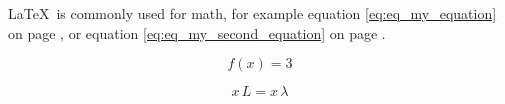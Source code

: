 \documentclass{article}
\begin{document}
\LaTeX~is commonly used for math, for example
equation \ref{eq:eq_my_equation} on page \pageref{eq:eq_my_equation}, or
equation \ref{eq:eq_my_second_equation} on page \pageref{eq:eq_my_second_equation}.

\begin{equation}
  f(x) = 3
  \label{eq:eq_my_equation}
\end{equation}

\begin{equation}
  x\,L=x\,\lambda
  \label{eq:eq_my_second_equation}
\end{equation}
\end{document}

